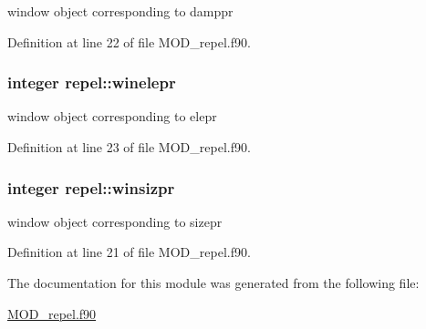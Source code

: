 window object corresponding to damppr 



Definition at line 22 of file M\-O\-D\-\_\-repel.\-f90.

\hypertarget{classrepel_abb02f8b2b5392a67b88a9651cbe602ad}{
\subsubsection[{winelepr}]{\setlength{\rightskip}{0pt plus 5cm}integer repel\-::winelepr}}\label{classrepel_abb02f8b2b5392a67b88a9651cbe602ad}


window object corresponding to elepr 



Definition at line 23 of file M\-O\-D\-\_\-repel.\-f90.

\hypertarget{classrepel_a0551b1278d6eef4019f16ceb407b917c}{
\subsubsection[{winsizpr}]{\setlength{\rightskip}{0pt plus 5cm}integer repel\-::winsizpr}}\label{classrepel_a0551b1278d6eef4019f16ceb407b917c}


window object corresponding to sizepr 



Definition at line 21 of file M\-O\-D\-\_\-repel.\-f90.



The documentation for this module was generated from the following file\-:\begin{DoxyCompactItemize}
\item 
\hyperlink{MOD__repel_8f90}{M\-O\-D\-\_\-repel.\-f90}\end{DoxyCompactItemize}
